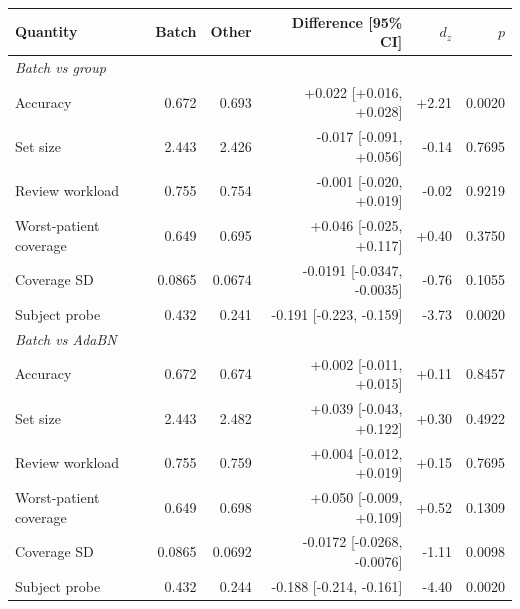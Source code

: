 \begin{tabular}{lrrrrr}
\toprule
Quantity & Batch & Other & Difference [95\% CI] & $d_z$ & $p$ \\
\midrule
\multicolumn{6}{l}{\emph{Batch vs group}}\\
Accuracy & 0.672 & 0.693 & +0.022 [+0.016, +0.028] & +2.21 & 0.0020 \\
Set size & 2.443 & 2.426 & -0.017 [-0.091, +0.056] & -0.14 & 0.7695 \\
Review workload & 0.755 & 0.754 & -0.001 [-0.020, +0.019] & -0.02 & 0.9219 \\
Worst-patient coverage & 0.649 & 0.695 & +0.046 [-0.025, +0.117] & +0.40 & 0.3750 \\
Coverage SD & 0.0865 & 0.0674 & -0.0191 [-0.0347, -0.0035] & -0.76 & 0.1055 \\
Subject probe & 0.432 & 0.241 & -0.191 [-0.223, -0.159] & -3.73 & 0.0020 \\
\midrule
\multicolumn{6}{l}{\emph{Batch vs AdaBN}}\\
Accuracy & 0.672 & 0.674 & +0.002 [-0.011, +0.015] & +0.11 & 0.8457 \\
Set size & 2.443 & 2.482 & +0.039 [-0.043, +0.122] & +0.30 & 0.4922 \\
Review workload & 0.755 & 0.759 & +0.004 [-0.012, +0.019] & +0.15 & 0.7695 \\
Worst-patient coverage & 0.649 & 0.698 & +0.050 [-0.009, +0.109] & +0.52 & 0.1309 \\
Coverage SD & 0.0865 & 0.0692 & -0.0172 [-0.0268, -0.0076] & -1.11 & 0.0098 \\
Subject probe & 0.432 & 0.244 & -0.188 [-0.214, -0.161] & -4.40 & 0.0020 \\
\bottomrule
\end{tabular}